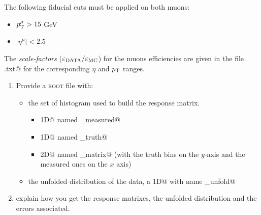 \documentclass[a4paper,11pt]{article}
\begin{document}
The following fiducial cuts must be applied on both muons:
\begin{itemize}
	\item $p_\textup{T}^\mu >15 $ GeV 
	\item $|\eta^\mu| < 2.5 $
\end{itemize}

The \emph{scale-factors} ($\varepsilon_\textup{DATA} / \varepsilon_\textup{MC}$) for the muons efficiencies are given in the file 
\verb@scalefactors.txt@ for the corresponding $\eta$ and $p_\textup{T}$ ranges.

\vspace{1cm}

\begin{enumerate}
	\item Provide a {\scshape root} file with:
		\begin{itemize}
		\item the set of histogram used to build the response matrix.
			\begin{itemize}
			\item \verb@TH1D@ named \verb@matrix_measured@
			\item \verb@TH1D@ named \verb@matrix_truth@
			\item \verb@TH2D@ named \verb@matrix_matrix@ (with the truth bins on the $y$-axis and the measured ones on the $x$ axis)
			\end{itemize}
		\item  the unfolded distribution of the data, a \verb@TH1D@ with name \verb@data_unfold@
		\end{itemize}
	\item explain how you get the response matrixes, the unfolded distribution and the errors associated.
\end{enumerate}

\FloatBarrier
\nocite{*}
%


\cleardoublepage
\end{document}
